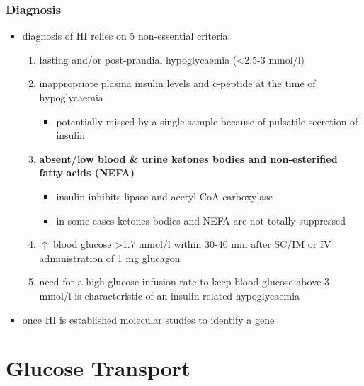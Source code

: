 \documentclass[12pt]{scrartcl}
\begin{document}
\subsubsection{Diagnosis}
\label{sec:org87bc85b}
\begin{itemize}
\item diagnosis of HI relies on 5 non-essential criteria:
\begin{enumerate}
\item fasting and/or post-prandial hypoglycaemia (\textless{}2.5-3 mmol/l)
\item inappropriate plasma insulin levels and c-peptide at the time of
hypoglycaemia
\begin{itemize}
\item potentially missed by a single sample because of pulsatile
secretion of insulin
\end{itemize}
\item \textbf{absent/low blood \& urine ketones bodies and non-esterified fatty}
\textbf{acids (NEFA)}
\begin{itemize}
\item insulin inhibits lipase and acetyl-CoA carboxylase
\item in some cases ketones bodies and NEFA are not totally
suppressed
\end{itemize}
\item \(\uparrow\) blood glucose \textgreater{}1.7 mmol/l within 30-40 min after
SC/IM or IV administration of 1 mg glucagon
\item need for a high glucose infusion rate to keep blood
glucose above 3 mmol/l is characteristic of an insulin related
hypoglycaemia
\end{enumerate}
\item once HI is established molecular studies to identify a gene
\end{itemize}
\section{Glucose Transport}
\label{sec:orgb35697e}
\end{document}
